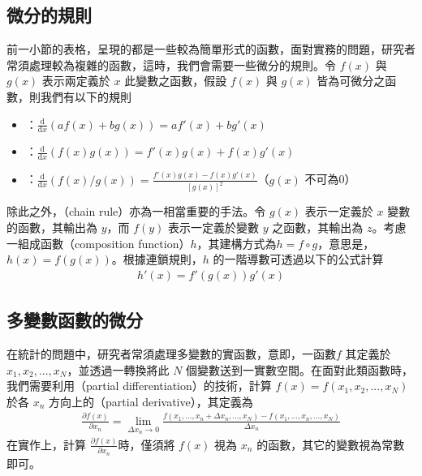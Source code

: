 \documentclass[letterpaper,10pt,english]{sphinxmanual}
\begin{document}
\subsection{微分的規則}
\label{\detokenize{notebook/mathematics-prerequisite:id13}}
前一小節的表格，呈現的都是一些較為簡單形式的函數，面對實務的問題，研究者常須處理較為複雜的函數，這時，我們會需要一些微分的規則。令 \(f(x)\) 與 \(g(x)\) 表示兩定義於 \(x\) 此變數之函數，假設 \(f(x)\) 與 \(g(x)\) 皆為可微分之函數，則我們有以下的規則
\begin{itemize}
\item {} 
：\(\frac{\text{d} }{\text{d}x} ( a f(x) + b g(x)) = a f'(x) + b g'(x)\)

\item {} 
：\(\frac{\text{d} }{\text{d}x} (f(x) g(x)) = f'(x) g(x) + f(x) g'(x)\)

\item {} 
：\(\frac{\text{d} }{\text{d}x} (f(x)/g(x)) = \frac{f'(x) g(x) - f(x) g'(x)}{[g(x)]^2}\)（\(g(x)\) 不可為0）

\end{itemize}

除此之外，（chain rule）亦為一相當重要的手法。令 \(g(x)\) 表示一定義於 \(x\) 變數的函數，其輸出為 \(y\)，而 \(f(y)\) 表示一定義於變數 \(y\) 之函數，其輸出為 \(z\)。考慮一組成函數（composition function）\(h\)，其建構方式為\(h =f \circ g\)，意思是，\(h(x) = f(g(x))\)。根據連鎖規則，\(h\) 的一階導數可透過以下的公式計算
\begin{equation*}
\begin{split}
h'(x) = f'(g(x))  g'(x)
\end{split}
\end{equation*}

\subsection{多變數函數的微分}
\label{\detokenize{notebook/mathematics-prerequisite:id14}}
在統計的問題中，研究者常須處理多變數的實函數，意即，一函數\(f\) 其定義於 \(x_1,x_2,...,x_N\)，並透過一轉換將此 \(N\) 個變數送到一實數空間。在面對此類函數時，我們需要利用（partial differentiation）的技術，計算 \(f(x)=f(x_1,x_2,...,x_N)\) 於各 \(x_n\) 方向上的（partial derivative），其定義為
\begin{equation*}
\begin{split}
\frac{\partial  f(x)}{\partial x_n}  = \lim_{\Delta x_n \to 0} \frac{f(x_1,...,x_n + \Delta x_n,...,x_N) - f(x_1,...,x_n,...,x_N)}{\Delta x_n}
\end{split}
\end{equation*}
在實作上，計算 \(\frac{\partial f(x)}{\partial x_n}\)時，僅須將 \(f(x)\) 視為 \(x_n\) 的函數，其它的變數視為常數即可。
\end{document}
